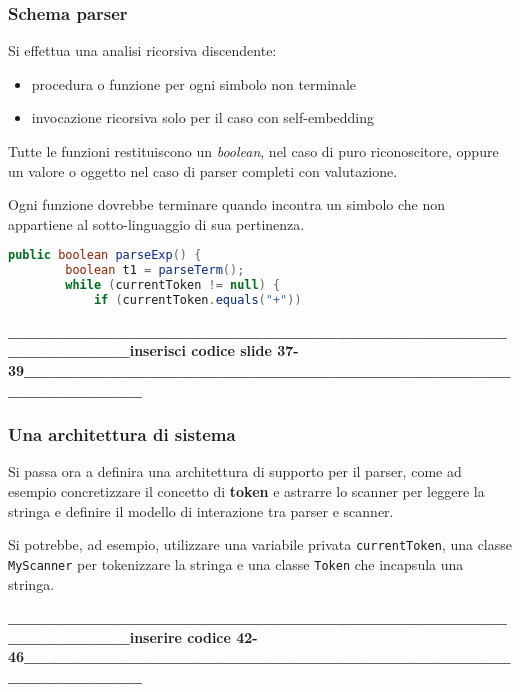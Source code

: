 \subsubsection{Schema parser}
Si effettua una analisi ricorsiva discendente:
\begin{itemize}
    \item procedura o funzione per ogni simbolo non terminale
    \item invocazione ricorsiva solo per il caso con self-embedding
\end{itemize}

Tutte le funzioni restituiscono un \textit{boolean}, nel caso di puro riconoscitore, oppure un valore o oggetto nel caso di parser completi con valutazione.

Ogni funzione dovrebbe terminare quando incontra un simbolo che non appartiene al sotto-linguaggio di sua pertinenza.

\begin{lstlisting}[language=java]
    public boolean parseExp() {
        boolean t1 = parseTerm();
        while (currentToken != null) {
            if (currentToken.equals("+"))
\end{lstlisting}

\textbf{\_\_\_\_\_\_\_\_\_\_\_\_\_\_\_\_\_\_\_\_\_\_\_\_\_\_\_\_\_\_\_\_\_\_\_\_\_\_\_\_\_\_\_\_\_\_\_\_\_\_\_inserisci codice slide 37-39\_\_\_\_\_\_\_\_\_\_\_\_\_\_\_\_\_\_\_\_\_\_\_\_\_\_\_\_\_\_\_\_\_\_\_\_\_\_\_\_\_\_\_\_\_\_\_\_\_\_\_}

\subsubsection{Una architettura di sistema}
Si passa ora a definira una architettura di supporto per il parser, come ad esempio concretizzare il concetto di \textbf{token} e astrarre lo scanner per leggere la stringa e definire il modello di interazione tra parser e scanner.

Si potrebbe, ad esempio, utilizzare una variabile privata \texttt{currentToken}, una classe \texttt{MyScanner} per tokenizzare la stringa e una classe \texttt{Token} che incapsula una stringa.

\textbf{\_\_\_\_\_\_\_\_\_\_\_\_\_\_\_\_\_\_\_\_\_\_\_\_\_\_\_\_\_\_\_\_\_\_\_\_\_\_\_\_\_\_\_\_\_\_\_\_\_\_\_inserire codice 42-46\_\_\_\_\_\_\_\_\_\_\_\_\_\_\_\_\_\_\_\_\_\_\_\_\_\_\_\_\_\_\_\_\_\_\_\_\_\_\_\_\_\_\_\_\_\_\_\_\_\_\_}

